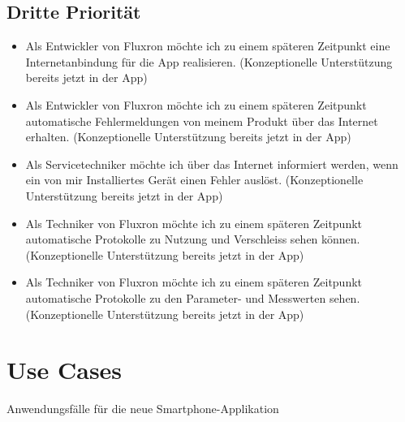 \subsection{Dritte Priorität}
\label{subsec:Dritte Priorität}

\begin{itemize}
\item Als Entwickler von Fluxron möchte ich zu einem späteren Zeitpunkt eine Internetanbindung für die App realisieren. (Konzeptionelle Unterstützung bereits jetzt in der App)
\item Als Entwickler von Fluxron möchte ich zu einem späteren Zeitpunkt automatische Fehlermeldungen von meinem Produkt über das Internet erhalten. (Konzeptionelle Unterstützung bereits jetzt in der App)
\item Als Servicetechniker möchte ich über das Internet informiert werden, wenn ein von mir Installiertes Gerät einen Fehler auslöst. (Konzeptionelle Unterstützung bereits jetzt in der App)
\item Als Techniker von Fluxron möchte ich zu einem späteren Zeitpunkt automatische Protokolle zu Nutzung und Verschleiss sehen können. (Konzeptionelle Unterstützung bereits jetzt in der App)
\item Als Techniker von Fluxron möchte ich zu einem späteren Zeitpunkt automatische Protokolle zu den Parameter- und Messwerten sehen. (Konzeptionelle Unterstützung bereits jetzt in der App)
\end{itemize}

\section{Use Cases}
\label{sec:Use Cases}
\centerline{
}
\caption{Anwendungsfälle für die neue Smartphone-Applikation}

